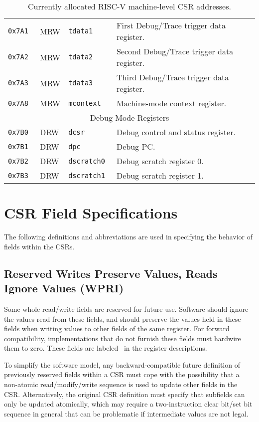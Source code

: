 \begin{table}[htb!]
\begin{center}
\begin{tabular}{|l|l|l|l|}
\tt 0x7A1 & MRW &\tt tdata1 & First Debug/Trace trigger data register. \\
\tt 0x7A2 & MRW &\tt tdata2 & Second Debug/Trace trigger data register. \\
\tt 0x7A3 & MRW &\tt tdata3 & Third Debug/Trace trigger data register. \\
\tt 0x7A8 & MRW &\tt mcontext & Machine-mode context register. \\
\hline
\multicolumn{4}{|c|}{Debug Mode Registers } \\
\hline
\tt 0x7B0 & DRW &\tt dcsr & Debug control and status register. \\
\tt 0x7B1 & DRW &\tt dpc & Debug PC. \\
\tt 0x7B2 & DRW &\tt dscratch0 & Debug scratch register 0. \\
\tt 0x7B3 & DRW &\tt dscratch1 & Debug scratch register 1. \\
\hline
\end{tabular}
\end{center}
\caption{Currently allocated RISC-V machine-level CSR addresses.}
\label{mcsrnames1}
\end{table}

\clearpage

\section{CSR Field Specifications}


The following definitions and abbreviations are used in specifying the
behavior of fields within the CSRs.

\subsection*{Reserved Writes Preserve Values, Reads Ignore Values (WPRI)}

Some whole read/write fields are reserved for future use.  Software
should ignore the values read from these fields, and should preserve
the values held in these fields when writing values to other fields of
the same register.
For forward compatibility, implementations that do not furnish these fields
must hardwire them to zero.
These fields are labeled \wpri\ in the register descriptions.

\begin{commentary}
To simplify the software model, any backward-compatible future
definition of previously reserved fields within a CSR must cope with
the possibility that a non-atomic read/modify/write sequence is used
to update other fields in the CSR.  Alternatively, the original CSR
definition must specify that subfields can only be updated atomically,
which may require a two-instruction clear bit/set bit sequence in
general that can be problematic if intermediate values are not legal.
\end{commentary}

